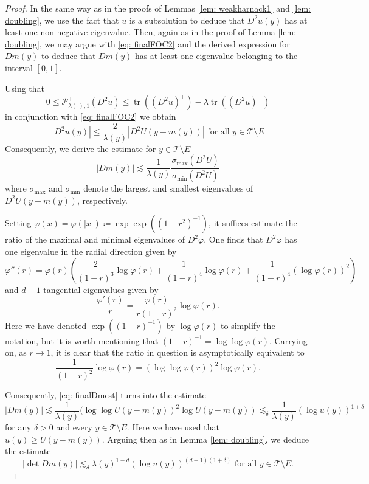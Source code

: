 \documentclass[reqno]{amsart}
\numberwithin{equation}{section}
\numberwithin{equation}{section}
\newcommand{\vphi}{\varphi}
\DeclareMathOperator{\tr}{tr}
\begin{document}
\begin{proof}
In the same way as in the proofs of Lemmas \ref{lem: weakharnack1} and \ref{lem: doubling}, we use the fact that $u$ is a subsolution to deduce that $D^2u(y)$ has at least one non-negative eigenvalue. Then, again as in the proof of Lemma \ref{lem: doubling}, we may argue with \eqref{eq: finalFOC2} and the derived expression for $Dm(y)$ to deduce that $Dm(y)$ has at least one eigenvalue belonging to the interval $[0,1]$.

Using that
$$0 \le \mathcal{P}^+_{\lambda(\cdot),1}(D^2u)\le \tr((D^2u)^+) - \lambda \tr((D^2u)^-)$$
in conjunction with \eqref{eq: finalFOC2} we obtain
$$|D^2u(y)| \le \frac{2}{\lambda(y)}|D^2U(y-m(y))| \text{ for all } y \in \mathcal{T} \setminus E$$
Consequently, we derive the estimate for $y \in \mathcal{T}\setminus E$
\begin{equation}
    \label{eq: finalDmest}
    |Dm(y)| \lesssim \frac{1}{\lambda(y)}\frac{\sigma_{\text{max}}(D^2U)}{\sigma_{\text{min}}(D^2U)}
\end{equation}
where $\sigma_{\text{max}}$ and $\sigma_{\text{min}}$ denote the largest and smallest eigenvalues of $D^2U(y-m(y))$, respectively.

Setting $\vphi(x) = \vphi(|x|) \coloneqq \exp\exp((1-r^2)^{-1})$, it suffices estimate the ratio of the maximal and minimal eigenvalues of $D^2\vphi$. One finds that $D^2\vphi$ has one eigenvalue in the radial direction given by 
$$\vphi''(r) = \vphi(r)\left(\frac{2}{(1-r)^3}\log \vphi(r) + \frac{1}{(1-r)^4} \log \vphi(r) + \frac{1}{(1-r)^4} (\log \vphi(r))^2\right)$$
and $d-1$ tangential eigenvalues given by 
$$\frac{\vphi'(r)}{r} = \frac{\vphi(r)}{r(1-r)^2} \log\vphi(r).$$
Here we have denoted $\exp((1-r)^{-1})$ by $\log \vphi(r)$ to simplify the notation, but it is worth mentioning that $(1-r)^{-1} = \log\log\vphi(r)$. Carrying on, as $r \to 1$, it is clear that the ratio in question is asymptotically equivalent to 
$$\frac{1}{(1-r)^2} \log \vphi(r) = (\log \log \vphi(r))^2 \log \vphi(r).$$

Consequently, \eqref{eq: finalDmest} turns into the estimate
$$|Dm(y)| \lesssim \frac{1}{\lambda(y)} (\log\log U(y-m(y))^2 \log U(y-m(y)) \lesssim_\delta\frac{1}{\lambda(y)} (\log u(y))^{1+\delta}$$
for any $\delta>0$ and every $y \in \mathcal{T}\setminus E$. Here we have used that $u(y) \ge U(y-m(y))$. Arguing then as in Lemma \ref{lem: doubling}, we deduce the estimate $$|\det Dm(y)| \lesssim_\delta \lambda(y)^{1-d}(\log u(y))^{(d-1)(1+\delta)} \text{ for all } y \in \mathcal{T}\setminus E.$$ 


\end{proof}
\end{document}
